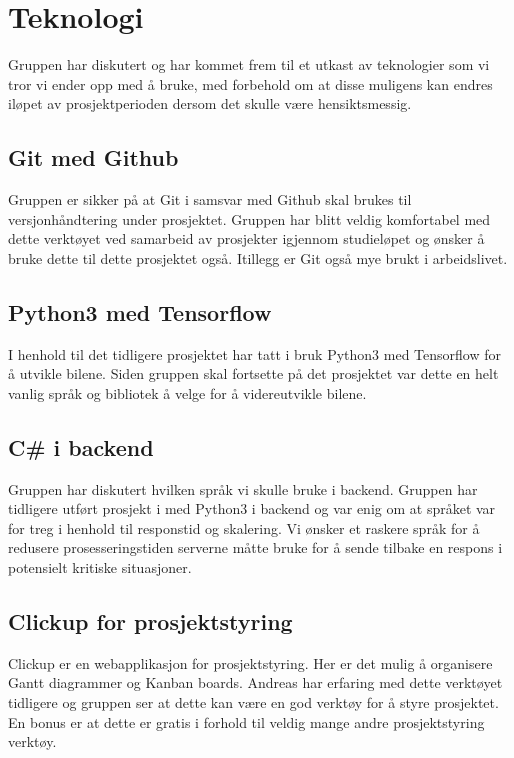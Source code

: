 \section{Teknologi}
Gruppen har diskutert og har kommet frem til et utkast av teknologier som vi tror vi ender opp med å bruke, med forbehold om at disse muligens kan endres iløpet av prosjektperioden dersom det skulle være hensiktsmessig.

\subsection{Git med Github}
Gruppen er sikker på at Git i samsvar med Github skal brukes til versjonhåndtering under prosjektet. Gruppen har blitt veldig komfortabel med dette verktøyet ved samarbeid av prosjekter igjennom studieløpet og ønsker å bruke dette til dette prosjektet også. Itillegg er Git også mye brukt i arbeidslivet.

\subsection{Python3 med Tensorflow}
I henhold til det tidligere prosjektet har \cite{bachelor2020} tatt i bruk Python3 med Tensorflow for å utvikle bilene. Siden gruppen skal fortsette på det prosjektet var dette en helt vanlig språk og bibliotek å velge for å videreutvikle bilene.

\subsection{C\# i backend}
Gruppen har diskutert hvilken språk vi skulle bruke i backend. Gruppen har tidligere utført prosjekt i med Python3 i backend og var enig om at språket var for treg i henhold til responstid og skalering. Vi ønsker et raskere språk for å redusere prosesseringstiden serverne måtte bruke for å sende tilbake en respons i potensielt kritiske situasjoner.

\subsection{Clickup for prosjektstyring}
Clickup er en webapplikasjon for prosjektstyring. Her er det mulig å organisere Gantt diagrammer og Kanban boards. Andreas har erfaring med dette verktøyet tidligere og gruppen ser at dette kan være en god verktøy for å styre prosjektet. En bonus er at dette er gratis i forhold til veldig mange andre prosjektstyring verktøy.

